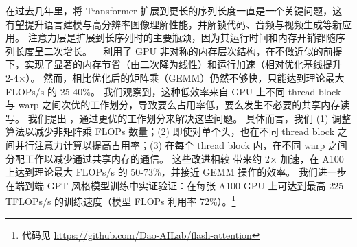 在过去几年里，将 Transformer 扩展到更长的序列长度一直是一个关键问题，这有望提升语言建模与高分辨率图像理解性能，并解锁代码、音频与视频生成等新应用。
注意力层是扩展到长序列时的主要瓶颈，因为其运行时间和内存开销都随序列长度呈二次增长。
\sysnameone~\citep{dao2022flashattention} 利用了 GPU 非对称的内存层次结构，在不做近似的前提下，实现了显著的内存节省（由二次降为线性）和运行加速（相对优化基线提升 2-4$\times$）。
然而，\sysnameone 相比优化后的矩阵乘（GEMM）仍然不够快，只能达到理论最大 FLOPs/s 的 25-40\%。
我们观察到，这种低效率来自 GPU 上不同 thread block 与 warp 之间次优的工作划分，导致要么占用率低，要么发生不必要的共享内存读写。
我们提出 \sysname，通过更优的工作划分来解决这些问题。
具体而言，我们 (1) 调整算法以减少非矩阵乘 FLOPs 数量；(2) 即使对单个头，也在不同 thread block 之间并行注意力计算以提高占用率；(3) 在每个 thread block 内，在不同 warp 之间分配工作以减少通过共享内存的通信。
这些改进相较 \sysnameone 带来约 2$\times$ 加速，在 A100 上达到理论最大 FLOPs/s 的 50-73\%，并接近 GEMM 操作的效率。
我们进一步在端到端 GPT 风格模型训练中实证验证：\sysname 在每张 A100 GPU 上可达到最高 225 TFLOPs/s 的训练速度（模型 FLOPs 利用率 72\%）。\footnote{\sysname
  代码见 \url{https://github.com/Dao-AILab/flash-attention}}

